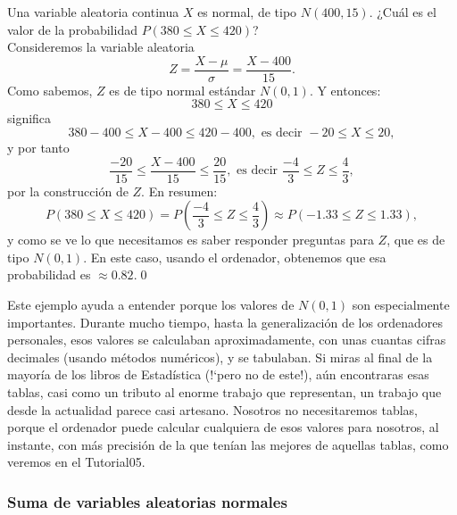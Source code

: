    \begin{ejemplo}
   \label{cap05:ejem:CalculoProbabilidadPorTipificacion}
   Una variable aleatoria continua $X$ es normal, de tipo $N(400,15)$. ¿Cuál es el valor de la probabilidad $P(380\leq X\leq 420)$?\\
   Consideremos la variable aleatoria
   \[Z=\dfrac{X-\mu}{\sigma}=\dfrac{X-400}{15}.\]
   Como sabemos, $Z$ es de tipo normal estándar $N(0,1)$. Y entonces:
   \[380\leq X\leq 420\]
   significa
   \[380-400\leq X-400\leq 420-400,\mbox{ es decir }-20\leq X\leq 20,\]
   y por tanto
   \[\dfrac{-20}{15}\leq \dfrac{X-400}{15}\leq\dfrac{20}{15},\mbox{ es decir }\dfrac{-4}{3}\leq Z\leq\dfrac{4}{3},\]
   por la construcción de $Z$. En resumen:
   \[P(380\leq X\leq 420)=P\left(\dfrac{-4}{3}\leq Z\leq\dfrac{4}{3}\right)\approx P(-1.33\leq Z\leq 1.33),\]
   y como se ve lo que necesitamos es saber responder preguntas para $Z$, que es de tipo $N(0,1)$. En este caso, usando el ordenador,  obtenemos que esa probabilidad es $\approx 0.82$.\qed
   \end{ejemplo}
Este ejemplo ayuda a entender porque los valores de $N(0,1)$ son especialmente importantes. Durante mucho tiempo, hasta la generalización de los ordenadores personales, esos valores se calculaban aproximadamente, con unas cuantas cifras decimales (usando métodos numéricos), y se tabulaban. Si miras al final de la mayoría de los libros de Estadística ({!`}pero no de este!), aún encontraras esas tablas, casi como un tributo al enorme trabajo que representan, un trabajo que desde la actualidad parece casi artesano. Nosotros no necesitaremos tablas, porque el ordenador puede calcular cualquiera de esos valores para nosotros, al instante, con más precisión de la que tenían las mejores de aquellas tablas, como veremos en el Tutorial05.

\subsubsection{Suma de variables aleatorias normales}
\label{cap05:subsubsec:SumaVariablesAleatoriasNormales}

